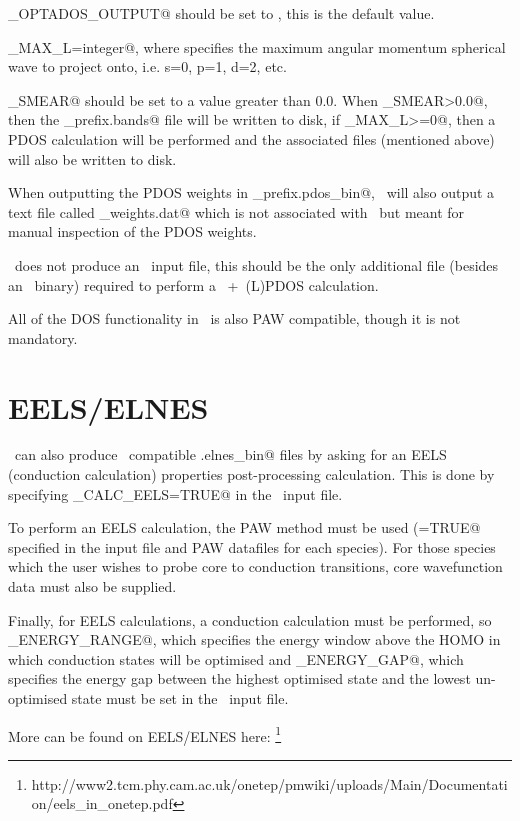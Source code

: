 \documentclass[a4paper,11pt,twoside]{book}
\begin{document}
{\verb@PDOS_OPTADOS_OUTPUT@ should be set to \verb@TRUE@,  this is the default value.

\verb@PDOS_MAX_L=integer@, where \verb@integer@ specifies the maximum angular momentum spherical wave to project onto, i.e. s=0, p=1, d=2, etc.

\verb@DOS_SMEAR@ should be set to a value greater than 0.0.
%
When \verb@DOS_SMEAR>0.0@, then the \verb@seedname_prefix.bands@ file will be written to disk, if \verb@PDOS_MAX_L>=0@, then a PDOS calculation will be performed and the associated files (mentioned above) will also be written to disk.

When outputting the PDOS weights in \verb@seedname_prefix.pdos_bin@, \onetep\  will also output a text file called \verb@pdos_weights.dat@ which is not associated with \optados\, but meant for manual inspection of the PDOS weights.

\onetep\  does not produce an \optados\ input file, this should be the only additional file (besides an \optados\ binary) required to perform a \onetep\ +\optados\ (L)PDOS calculation.

All of the DOS functionality in \onetep\  is also PAW compatible, though it is not mandatory.


\section{EELS/ELNES}

\onetep\  can also produce \optados\ compatible \verb@seedname.elnes_bin@ files by asking for an EELS\cite{tait:JPCM:2016} (conduction calculation) properties post-processing calculation. This is done by specifying \verb@COND_CALC_EELS=TRUE@ in the \onetep\ input file.

To perform an EELS calculation, the PAW method must be used (\verb@PAW=TRUE@ specified in the input file and PAW datafiles for each species). For those species which the user wishes to probe core to conduction transitions, core wavefunction data must also be supplied.

Finally, for EELS calculations, a conduction calculation must be performed, so \verb@COND_ENERGY_RANGE@, which specifies the energy window above the HOMO in which conduction states will be optimised and \verb@COND_ENERGY_GAP@, which specifies the energy gap between the highest optimised state and the lowest un-optimised state must be set in the \onetep\ input file.


More can be found on EELS/ELNES here: \footnote{http://www2.tcm.phy.cam.ac.uk/onetep/pmwiki/uploads/Main/Documentation/eels\_in\_onetep.pdf}

}
\end{document}
